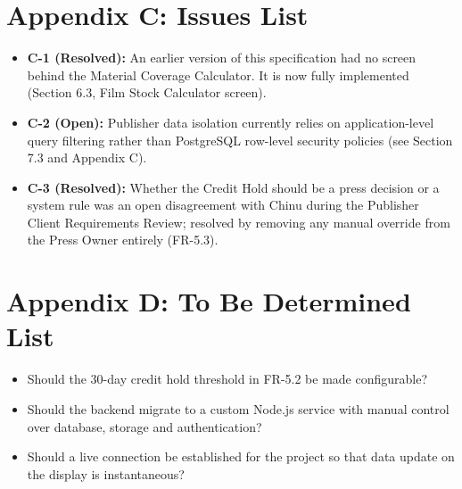 \documentclass{scrreprt}
\begin{document}
\chapter*{Appendix C: Issues List}
\begin{itemize}
\item \textbf{C-1 (Resolved):} An earlier version of this specification had no screen behind the Material Coverage Calculator. It is now fully implemented (Section 6.3, Film Stock Calculator screen).
\item \textbf{C-2 (Open):} Publisher data isolation currently relies on application-level query filtering rather than PostgreSQL row-level security policies (see Section 7.3 and Appendix C).
\item \textbf{C-3 (Resolved):} Whether the Credit Hold should be a press decision or a system rule was an open disagreement with Chinu during the Publisher Client Requirements Review; resolved by removing any manual override from the Press Owner entirely (FR-5.3).
\end{itemize}

\chapter*{Appendix D: To Be Determined List}
\begin{itemize}
\item Should the 30-day credit hold threshold in FR-5.2 be made configurable?
\item Should the backend migrate to a custom Node.js service with manual control over database, storage and authentication?
\item Should a live connection be established for the project so that data update on the display is instantaneous?
\end{itemize}
\end{document}
